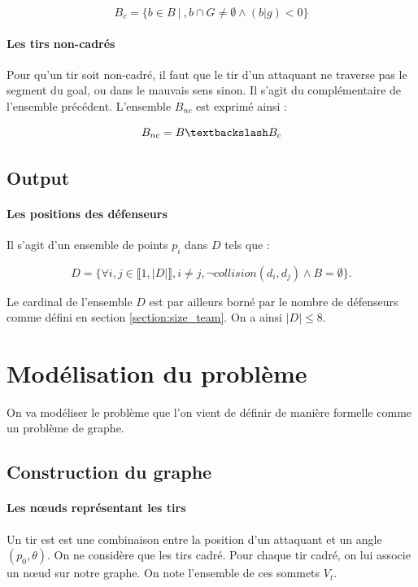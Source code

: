 \documentclass[12pt]{article}
\begin{document}
\begin{equation*}
    B_c = \{ b \in B \ | \ , b \cap G \ne \emptyset \wedge (b|g) < 0  \}
\end{equation*}


\paragraph{Les tirs non-cadrés}
Pour qu'un tir soit non-cadré, il faut que le tir d'un attaquant ne traverse pas le segment du goal, ou dans le mauvais sens sinon. Il s'agit du complémentaire de l'ensemble précédent. L'ensemble $B_{nc}$ est exprimé ainsi :

\begin{equation*}
    B_{nc} = B \textbackslash B_c
\end{equation*}

\subsection{Output}

\paragraph{Les positions des défenseurs} Il s'agit d'un ensemble de points $p_i$ dans $D$ tels que :

\begin{equation*}
D = \{ \forall i, j \in \llbracket 1, |D| \rrbracket, i \ne j, \neg collision(d_i, d_j) \wedge B = \emptyset \}.
\end{equation*}

Le cardinal de l'ensemble $D$ est par ailleurs borné par le nombre de défenseurs comme défini en section \ref{section:size_team}. On a ainsi $|D| \leqslant 8$.

\section{Modélisation du problème}

On va modéliser le problème que l'on vient de définir de manière formelle comme un problème de graphe.

\subsection{Construction du graphe}

\paragraph{Les n\oe uds représentant les tirs}
Un tir est est une combinaison entre la position d'un attaquant et un angle $(p_0, \theta)$. On ne considère que les tirs cadré. Pour chaque tir cadré, on lui associe un n\oe ud sur notre graphe. On note l'ensemble de ces sommets $V_t$.
\end{document}
